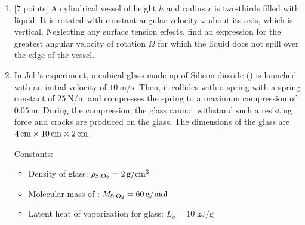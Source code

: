 \begin{enumerate}[align=left,start=1,label=\textbf{\textcolor{meared}{Problem \arabic*}}]
        The cube continuously emits red, blue, or green light on exactly three specific faces, with each such face emitting photons perpendicular to the face. He places the cube on a large flat frictionless surface with the face labelled \emph{2} facing directly north and face \emph{1} pointing upward. The cube moves without any external force and solely from emitting light at a power of \qty{20}{\watt} per light emitting face. Bala records its motion using his favorite Lenovo Thinkpad. When he starts the experiment, all of the light emitting faces emit red light. After $3$ hours, they all start emitting blue light, and then after $3$ hours again they all emit green light, and red light again and the loop repeats. After $7$ hours of the experiment, Bala measures that the cube has an instantaneous velocity of $v = \qty[per-mode = symbol]{1.187}{\meter\per\second}$, directly southeast. 
        \begin{enumerate}
            \item {[$2$ points]} Find all possible combinations of the $3$ light emitting faces.
            \item {[$4$ points]} What is the velocity of the cube after $5$ hours had elapsed since the start of the experiment?
        \end{enumerate}
    \item {[$7$ points]}  
        A cylindrical vessel of height $h$ and radius $r$ is two-thirds filled with liquid. It is rotated with constant angular velocity $\omega$ about its axis, which is vertical. Neglecting any surface tension effects, find an expression for the greatest angular velocity of rotation $\Omega$ for which the liquid docs not spill over the edge of the vessel.
    \item 
        In Jeli's experiment, a cubical glass made up of Silicon dioxide () is launched with an initial velocity of $\qty[per-mode = symbol]{10}{\meter\per\second}$. Then, it collides with a spring with a spring constant of $\qty[per-mode = symbol]{25}{\newton\per\meter}$ and compresses the spring to a maximum compression of $\qty[per-mode = symbol]{0.05}{\meter}$. During the compression, the glass cannot withstand such a resisting force and cracks are produced on the glass. The dimensions of the glass are $\qtyproduct{4 x 10 x 2}{\centi\meter}$.

        Constants:
        \begin{itemize}
            \item Density of glass: $\rho_{\ce{SiO_2}} = \qty[per-mode = symbol]{2}{\gram\per\centi\meter\tothe{3}}$
            \item Molecular mass of : $M_{\ce{SiO_2}} = \qty[per-mode = symbol]{60}{\gram\per\mole}$
            \item Latent heat of vaporization for glass: $L_g = \qty[per-mode = symbol]{10}{\kilo\joule\per\gram}$
        \end{itemize}


\end{enumerate}
